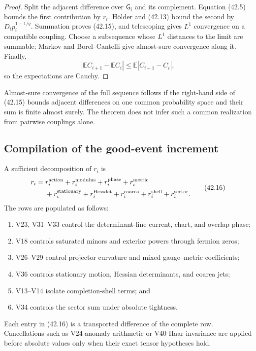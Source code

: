 \documentclass[11pt]{article}
\begin{document}
\begin{proof}
Split the adjacent difference over \(\mathsf G_i\) and its complement.
Equation (42.5) bounds the first contribution by \(r_i\).
Hölder and (42.13) bound the second by
\(D_ip_i^{1-1/q}\).  Summation proves (42.15), and telescoping gives
\(L^1\) convergence on a compatible coupling.  Choose a subsequence
whose \(L^1\) distances to the limit are summable; Markov and
Borel--Cantelli give almost-sure convergence along it.  Finally,
\[
 |\mathbb EC_{i+1}-\mathbb EC_i|
 \leq\mathbb E|C_{i+1}-C_i|,
\]
so the expectations are Cauchy.
\end{proof}

Almost-sure convergence of the full sequence follows if the right-hand
side of (42.15) bounds adjacent differences on one common probability
space and their sum is finite almost surely.  The theorem does not infer
such a common realization from pairwise couplings alone.

\subsection{Compilation of the good-event increment}

A sufficient decomposition of \(r_i\) is
\[
 \begin{split}
 r_i={}&
 r_i^{\rm action}
 +r_i^{\rm modulus}
 +r_i^{\rm phase}
 +r_i^{\rm metric}\\
 &+r_i^{\rm stationary}
 +r_i^{\rm Hessdet}
 +r_i^{\rm coarea}
 +r_i^{\rm shell}
 +r_i^{\rm sector}.
 \end{split}
 \tag{42.16}
\]
The rows are populated as follows:
\begin{enumerate}[label=\textnormal{(\roman*)}]
\item V23, V31--V33 control the determinant-line current, chart, and
overlap phase;
\item V18 controls saturated minors and exterior powers through
fermion zeros;
\item V26--V29 control projector curvature and mixed gauge--metric
coefficients;
\item V36 controls stationary motion, Hessian determinants, and coarea
jets;
\item V13--V14 isolate completion-shell terms; and
\item V34 controls the sector sum under absolute tightness.
\end{enumerate}
Each entry in (42.16) is a transported difference of the complete row.
Cancellations such as V24 anomaly arithmetic or V40 Haar invariance are
applied before absolute values only when their exact tensor hypotheses
hold.
\end{document}
